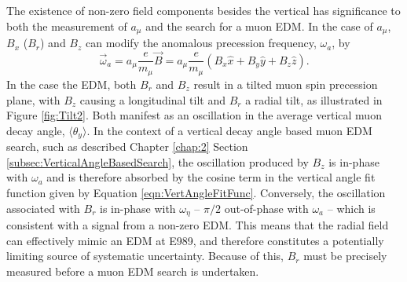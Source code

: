 The existence of non-zero field components besides the vertical has significance to both the measurement of $a_{\mu}$ and the search for a muon EDM. In the case of $a_{\mu}$, $B_{x}$ ($B_{r}$) and $B_{z}$ can modify the anomalous precession frequency, $\omega_{a}$, by 
%
\begin{equation}
  \vec{\omega}_{a}=a_{\mu}\frac{e}{m_{\mu}}\vec{B}=a_{\mu}\frac{e}{m_{\mu}}(B_{x}\hat{x}+B_{y}\hat{y}+B_{z}\hat{z}).
  \label{eqn:omegaa_with_field_components}
\end{equation}
%
In the case the EDM, both $B_{r}$ and $B_{z}$ result in a tilted muon spin precession plane, with $B_{z}$ causing a longitudinal tilt and $B_{r}$ a radial tilt, as illustrated in Figure \ref{fig:Tilt2}. Both manifest as an oscillation in the average vertical muon decay angle, $\langle\theta_{y}\rangle$. In the context of a vertical decay angle based muon EDM search, such as described Chapter \ref{chap:2} Section \ref{subsec:VerticalAngleBasedSearch}, the oscillation produced by $B_{z}$ is in-phase with $\omega_{a}$ and is therefore absorbed by the cosine term in the vertical angle fit function given by Equation \ref{eqn:VertAngleFitFunc}. Conversely, the oscillation associated with $B_{r}$ is in-phase with $\omega_{\eta}$ -- $\pi/2$ out-of-phase with $\omega_{a}$ -- which is consistent with a signal from a non-zero EDM. This means that the radial field can effectively mimic an EDM at E989, and therefore constitutes a potentially limiting source of systematic uncertainty. Because of this, $B_{r}$ must be precisely measured before a muon EDM search is undertaken.
%
